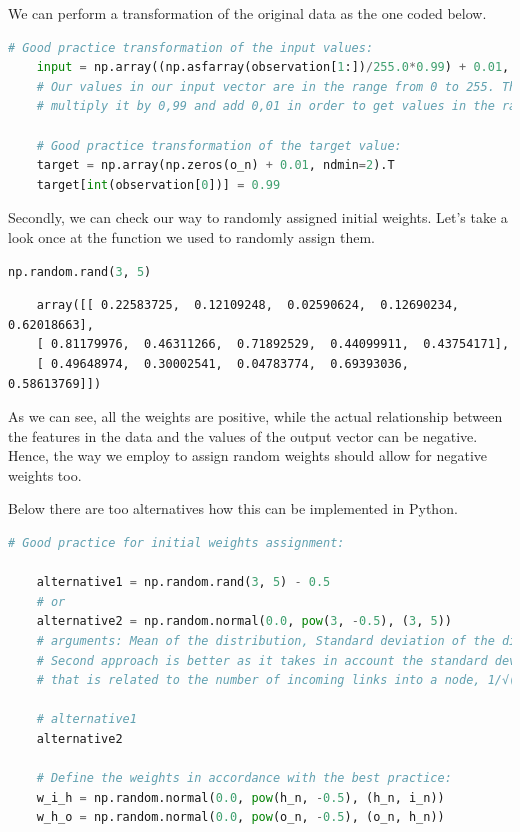 We can perform a transformation of the original data as the one coded below.

\begin{lstlisting}[language=Python]
    # Good practice transformation of the input values:
    input = np.array((np.asfarray(observation[1:])/255.0*0.99) + 0.01, ndmin=2).T 
    # Our values in our input vector are in the range from 0 to 255. Therefore we should divide input vector by 255, 
    # multiply it by 0,99 and add 0,01 in order to get values in the range from 0,01 to 1.
    
    # Good practice transformation of the target value:
    target = np.array(np.zeros(o_n) + 0.01, ndmin=2).T
    target[int(observation[0])] = 0.99
\end{lstlisting}

Secondly, we can check our way to randomly assigned initial weights. Let's take a look once at the function we used to randomly assign them.

\begin{lstlisting}[language=Python]
    np.random.rand(3, 5)
\end{lstlisting}

\begin{lstlisting}
    array([[ 0.22583725,  0.12109248,  0.02590624,  0.12690234,  0.62018663],
    [ 0.81179976,  0.46311266,  0.71892529,  0.44099911,  0.43754171],
    [ 0.49648974,  0.30002541,  0.04783774,  0.69393036,  0.58613769]])
\end{lstlisting}

As we can see, all the weights are positive, while the actual relationship between the features in the data and the values of the output vector can be negative. Hence, the way we employ to assign random weights should allow for negative weights too.

Below there are too alternatives how this can be implemented in Python.

\begin{lstlisting}[language=Python]
    # Good practice for initial weights assignment:
    
    alternative1 = np.random.rand(3, 5) - 0.5 
    # or
    alternative2 = np.random.normal(0.0, pow(3, -0.5), (3, 5)) 
    # arguments: Mean of the distribution, Standard deviation of the distribution, Output shape.
    # Second approach is better as it takes in account the standard deviation 
    # that is related to the number of incoming links into a node, 1/√(number of incoming links).
    
    # alternative1
    alternative2

    # Define the weights in accordance with the best practice:
    w_i_h = np.random.normal(0.0, pow(h_n, -0.5), (h_n, i_n))
    w_h_o = np.random.normal(0.0, pow(o_n, -0.5), (o_n, h_n))
\end{lstlisting}

